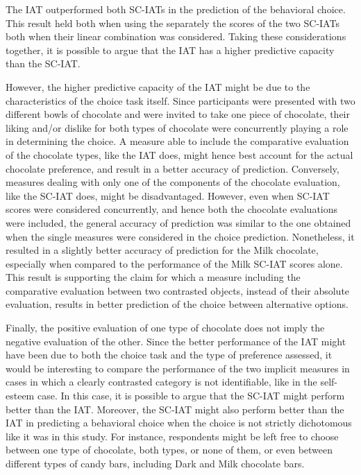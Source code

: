 \documentclass[12pt]{book}
\begin{document}
The IAT outperformed both SC-IATs in the prediction of the behavioral choice. This result held both when using the separately the scores of the two SC-IATs both when their linear combination was considered. Taking these considerations together, it is possible to argue that the IAT has a higher predictive capacity than the SC-IAT. 

However, the higher predictive capacity of the IAT might be due to the characteristics of the choice task itself. Since participants were presented with two different bowls of chocolate and were invited to take one piece of chocolate, their liking and/or dislike for both types of chocolate were concurrently playing a role in determining the choice. A measure able to include the comparative evaluation of the chocolate types, like the IAT does, might hence best account for the actual chocolate preference, and result in a better accuracy of prediction. Conversely,  measures dealing with only one of the components of the chocolate evaluation, like the SC-IAT does, might be disadvantaged. However, even when SC-IAT scores were considered concurrently, and hence both the chocolate evaluations were included, the general accuracy of prediction was similar to the one obtained when the single measures were considered in the choice prediction. Nonetheless, it resulted in a slightly better accuracy of prediction for the Milk chocolate, especially when compared to the performance of the Milk SC-IAT scores alone. This result is supporting the claim for which a measure including the comparative evaluation between two contrasted objects, instead of their absolute evaluation, results in better prediction of the choice between alternative options.
 
Finally, the positive evaluation of one type of chocolate does not imply the negative evaluation of the other. Since the better performance of the IAT might have been due to both the choice task and the type of preference assessed, it would be interesting to compare the performance of the two implicit measures in cases in which a clearly contrasted category is not identifiable, like in the self-esteem case. In this case, it is possible to argue that the SC-IAT might perform better than the IAT. Moreover, the SC-IAT might also perform better than the IAT in predicting a behavioral choice when the choice is not strictly dichotomous like it was in this study. For instance, respondents might be left free to choose between one type of chocolate, both types, or none of them, or even between different types of candy bars, including Dark and Milk chocolate bars.
\end{document}
